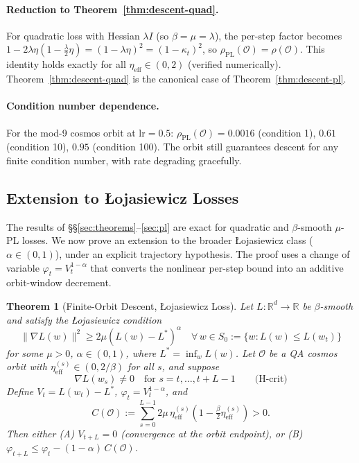 \documentclass[11pt]{article}
\newtheorem{theorem}{Theorem}[section]
\theoremstyle{definition}
\theoremstyle{remark}
\newcommand{\etaeff}{\eta_{\mathrm{eff}}}
\newcommand{\rhoO}{\rho(\mathcal{O})}
\newcommand{\rhoPL}{\rho_{\mathrm{PL}}(\mathcal{O})}
\begin{document}
\paragraph{Reduction to Theorem~\ref{thm:descent-quad}.}
For quadratic loss with Hessian $\lambda I$ (so $\beta=\mu=\lambda$), the per-step
factor becomes $1-2\lambda\eta(1-\tfrac{\lambda}{2}\eta)=(1-\lambda\eta)^2=(1-\kappa_t)^2$,
so $\rhoPL=\rhoO$. This identity holds exactly for all $\etaeff\in(0,2)$ (verified
numerically). Theorem~\ref{thm:descent-quad} is the canonical case of
Theorem~\ref{thm:descent-pl}.

\paragraph{Condition number dependence.}
For the mod-9 cosmos orbit at $\mathrm{lr}=0.5$: $\rhoPL=0.0016$ (condition 1),
$0.61$ (condition 10), $0.95$ (condition 100). The orbit still guarantees descent for
any finite condition number, with rate degrading gracefully.

\subsection{Extension to \L{}ojasiewicz Losses}
\label{sec:lojasiewicz}

The results of \S\S\ref{sec:theorems}--\ref{sec:pl} are exact for quadratic and
$\beta$-smooth $\mu$-PL losses. We now prove an extension to the broader
\L{}ojasiewicz class ($\alpha\in(0,1)$), under an explicit trajectory hypothesis.
The proof uses a change of variable $\varphi_t=V_t^{1-\alpha}$ that converts the
nonlinear per-step bound into an additive orbit-window decrement.

\begin{theorem}[Finite-Orbit Descent, \L{}ojasiewicz Loss]
\label{thm:descent-loj}
Let $L:\mathbb{R}^d\to\mathbb{R}$ be $\beta$-smooth and satisfy the
\L{}ojasiewicz condition
\[
  \|\nabla L(w)\|^2 \geq 2\mu(L(w)-L^*)^\alpha
  \quad \forall\,w\in S_0 := \{w: L(w)\leq L(w_t)\}
\]
for some $\mu>0$, $\alpha\in(0,1)$, where $L^*=\inf_w L(w)$.
Let $\mathcal{O}$ be a QA cosmos orbit with $\etaeff^{(s)}\in(0,2/\beta)$ for all $s$,
and suppose
\begin{equation*}
  \nabla L(w_s)\neq 0 \quad \text{for } s=t,\ldots,t+L-1 \qquad \text{(H-crit)}
\end{equation*}
Define $V_t=L(w_t)-L^*$, $\varphi_t=V_t^{1-\alpha}$, and
\[
  C(\mathcal{O}) := \sum_{s=0}^{L-1} 2\mu\,\etaeff^{(s)}\!\left(1-\tfrac{\beta}{2}\etaeff^{(s)}\right) > 0.
\]
Then either \textup{(A)} $V_{t+L}=0$ (convergence at the orbit endpoint), or
\textup{(B)} $\varphi_{t+L} \leq \varphi_t - (1-\alpha)\,C(\mathcal{O})$.
\end{theorem}
\end{document}
